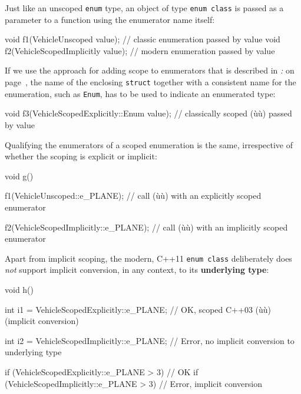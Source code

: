 \noindent Just like an unscoped \texttt{enum} type, an object of type
\texttt{enum}~\texttt{class} is passed as a parameter to a function
using the enumerator name itself:

\begin{emcppslisting}[emcppsbatch=e3]
void f1(VehicleUnscoped value);          // classic enumeration passed by value
void f2(VehicleScopedImplicitly value);  // modern enumeration passed by value
\end{emcppslisting}

If we use the approach for
adding scope to enumerators that is described in \textit{: } on page~\pageref{drawbacks-relating-to-weakly-typed,-c++03-enumerators}, the name of the enclosing \texttt{struct} together with a
consistent name for the enumeration, such as \texttt{Enum}, has to be used to indicate an
enumerated type:

\begin{emcppslisting}[emcppsbatch=e3,basicstyle={\ttfamily\footnotesize}]
void f3(VehicleScopedExplicitly::Enum value);
    // classically scoped (ù{}ù) passed by value
\end{emcppslisting}

\noindent Qualifying the enumerators of a scoped enumeration is the same,
irrespective of whether the scoping is explicit or implicit:

\begin{emcppslisting}[emcppsbatch=e3]
void g()
{
    f1(VehicleUnscoped::e_PLANE);
        // call (ù{}ù) with an explicitly scoped enumerator

    f2(VehicleScopedImplicitly::e_PLANE);
        // call (ù{}ù) with an implicitly scoped enumerator
}
\end{emcppslisting}

\noindent Apart from implicit scoping, the modern, C++11
\texttt{enum}~\texttt{class} deliberately does \emph{not} support
implicit conversion, in any context, to its \textbf{underlying type}:

\begin{emcppslisting}[emcppsbatch=e3]
void h()
{
    int i1 = VehicleScopedExplicitly::e_PLANE;
       // OK, scoped C++03 (ù{}ù) (implicit conversion)
 
    int i2 = VehicleScopedImplicitly::e_PLANE;
        // Error, no implicit conversion to underlying type

    if (VehicleScopedExplicitly::e_PLANE > 3) {} // OK
    if (VehicleScopedImplicitly::e_PLANE > 3) {} // Error, implicit conversion
}
\end{emcppslisting}

